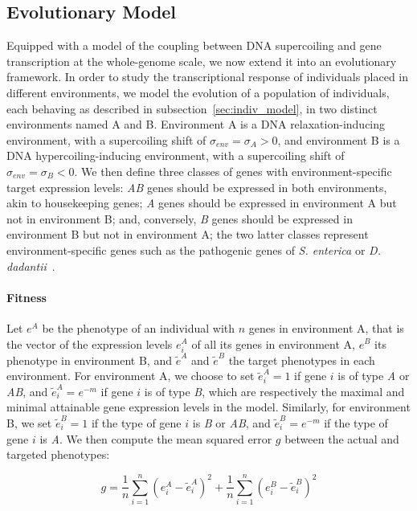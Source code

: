 \subsection{Evolutionary Model}
\label{sec:evol_model}

Equipped with a model of the coupling between DNA supercoiling and gene transcription at the whole-genome scale, we now extend it into an evolutionary framework.
In order to study the transcriptional response of individuals placed in different environments, we model the evolution of a population of individuals, each behaving as described in subsection~\ref{sec:indiv_model}, in two distinct environments named A and B.
Environment A is a DNA relaxation-inducing environment, with a supercoiling shift of $\sigma_{env} = \sigma_A > 0$, and environment B is a DNA hypercoiling-inducing environment, with a supercoiling shift of $\sigma_{env} = \sigma_B < 0$.
We then define three classes of genes with environment-specific target expression levels: \emph{AB} genes should be expressed in both environments, akin to housekeeping genes; \emph{A} genes should be expressed in environment A but not in environment B; and, conversely, \emph{B} genes should be expressed in environment B but not in environment A; the two latter classes represent environment-specific genes such as the pathogenic genes of \emph{S. enterica} or \emph{D. dadantii}~\citep{cameron2012,herault2014}.

\paragraph{Fitness}
Let $e^A$ be the phenotype of an individual with $n$ genes in environment A, that is the vector of the expression levels $e^A_i$ of all its genes in environment A, $e^B$ its phenotype in environment B, and $\tilde{e}^A$ and $\tilde{e}^B$ the target phenotypes in each environment.
For environment A, we choose to set $\tilde{e}^A_i = 1$ if gene $i$ is of type \emph{A} or \emph{AB}, and $\tilde{e}^A_i = e^{-m}$ if gene $i$ is of type \emph{B}, which are respectively the maximal and minimal attainable gene expression levels in the model.
Similarly, for environment B, we set $\tilde{e}^B_i = 1$ if the type of gene $i$ is \emph{B} or \emph{AB}, and $\tilde{e}^B_i = e^{-m}$ if the type of gene $i$ is \emph{A}.
We then compute the mean squared error $g$ between the actual and targeted phenotypes:

\begin{equation}
  g = \frac{1}{n} \sum_{i=1}^{n} (e^A_i - \tilde{e}^A_i)^2 + \frac{1}{n} \sum_{i=1}^{n} (e^B_i - \tilde{e}^B_i)^2
  \label{eq:gap}
\end{equation}

